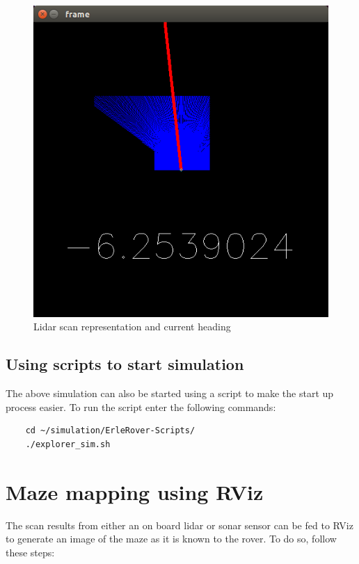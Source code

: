 \documentclass{report}
\begin{document}
\begin{figure}[ht]
	\centering
	\includegraphics[scale=0.33]{Images/rover_maze_3}
	\caption{Lidar scan representation and current heading}
	\label{lidarRepresentation}
\end{figure}

\subsection{Using scripts to start simulation}
The above simulation can also be started using a script to make the start up process easier. To run the script enter the following commands:

\begin{lstlisting}
	cd ~/simulation/ErleRover-Scripts/
	./explorer_sim.sh 
\end{lstlisting}



\iffalse
\section{Maze mapping using RViz}
The scan results from either an on board lidar or sonar sensor can be fed to RViz to generate an image of the maze as it is known to the rover. To do so, follow these steps:
\end{document}
